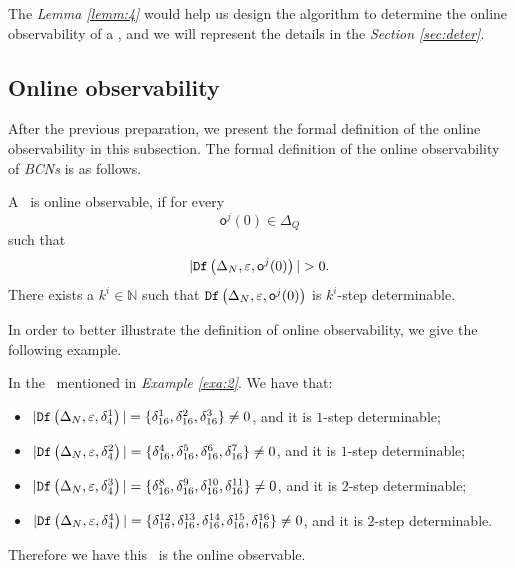 The {\em Lemma \ref{lemm:4}} would help us design the algorithm to determine the online observability of a \BCN, and we will represent the details in the {\em Section \ref{sec:deter}}.


\subsection{Online observability}
After the previous preparation, we present the formal definition of the online observability in this subsection. The formal definition of the online observability of {\em BCNs} is as follows.

\begin{definition}
 A \BCN\ is online observable,
if for every \[\mathsf{o}^{j}(0)\in \Delta_Q\] such that \[|\Ded\left(\Delta_N,\varepsilon, \mathsf{o}^{j}(0)\right)|> 0.\] There exists a $k^{i}\in \mathbb{N}$ such that ${\tt Df}\left(\Delta_N,\varepsilon,\mathsf{o}^{j}(0)\right)$ is $k^{i}$-step determinable.
\end{definition}


 In order to better illustrate the definition of online observability, we give the following example.

\begin{example}
In the \BCN\ mentioned in {\em Example \ref{exa:2}}.  We have that:
 \begin{itemize}
 \item $|{\tt Df}\left(\Delta_N,\varepsilon, \delta_{4}^1\right)|=\{\delta_{16}^1,\delta_{16}^2,\delta_{16}^3\}\neq 0$, and it is $1$-step determinable;
 \item $|{\tt Df}\left(\Delta_N,\varepsilon, \delta_{4}^2\right)|=\{\delta_{16}^4,\delta_{16}^5,\delta_{16}^6,\delta_{16}^7\}\neq 0$, and it is $1$-step determinable;
 \item $|{\tt Df}\left(\Delta_N,\varepsilon, \delta_{4}^3\right)|=\{\delta_{16}^8,\delta_{16}^9,\delta_{16}^{10},\delta_{16}^{11}\}\neq 0$, and it is $2$-step determinable;
 \item $|{\tt Df}\left(\Delta_N,\varepsilon, \delta_{4}^4\right)|=\{\delta_{16}^{12},\delta_{16}^{13},\delta_{16}^{14},\delta_{16}^{15},\delta_{16}^{16}\}\neq 0$, and it is $2$-step determinable.
 \end{itemize}
 
Therefore we have this \BCN\ is the online observable.
\label{exa:10}
\end{example}  


